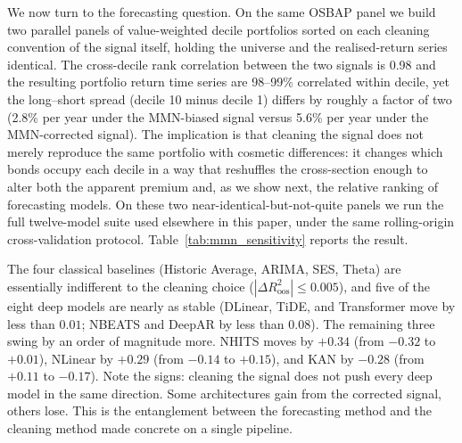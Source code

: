 \documentclass{article}
\newcommand{\floatsource}[1]{\caption*{\footnotesize\emph{#1}}}
\begin{document}
We now turn to the forecasting question. On the same OSBAP panel we build two parallel panels of value-weighted decile portfolios sorted on each cleaning convention of the signal itself, holding the universe and the realised-return series identical. The cross-decile rank correlation between the two signals is 0.98 and the resulting portfolio return time series are 98--99\% correlated within decile, yet the long--short spread (decile 10 minus decile 1) differs by roughly a factor of two (2.8\% per year under the MMN-biased signal versus 5.6\% per year under the MMN-corrected signal). The implication is that cleaning the signal does not merely reproduce the same portfolio with cosmetic differences: it changes which bonds occupy each decile in a way that reshuffles the cross-section enough to alter both the apparent premium and, as we show next, the relative ranking of forecasting models. On these two near-identical-but-not-quite panels we run the full twelve-model suite used elsewhere in this paper, under the same rolling-origin cross-validation protocol. Table~\ref{tab:mmn_sensitivity} reports the result.

\begin{table}[htbp]
\centering
\caption{Forecasting Sensitivity to Signal Cleaning: Credit-Spread Decile Portfolios}
\label{tab:mmn_sensitivity}

\caption*{\footnotesize
\textbf{Note:} Out-of-sample $R^2$ ($R^2_{\text{oos}}$) and Mean Absolute Scaled Error (MASE) for the twelve forecasting models reported elsewhere in the paper, applied to two value-weighted decile-portfolio panels of corporate bonds. The MMN-biased panel sorts bonds by a credit spread constructed from MMN-contaminated TRACE prices. The MMN-corrected panel applies the correction of \citet{Dickerson2024}. The realized return, universe, and cross-validation protocol are held fixed; only the signal used for decile assignment differs. $\Delta$ columns report corrected minus biased. Bold values highlight the best performing model within each level column ($R^2_{\text{oos}}$ higher is better; MASE lower is better).}
\floatsource{Sources: Open Source Bond Asset Pricing, Authors' analysis}
\end{table}

The four classical baselines (Historic Average, ARIMA, SES, Theta) are essentially indifferent to the cleaning choice ($|\Delta R^2_{\text{oos}}| \leq 0.005$), and five of the eight deep models are nearly as stable (DLinear, TiDE, and Transformer move by less than $0.01$; NBEATS and DeepAR by less than $0.08$). The remaining three swing by an order of magnitude more. NHITS moves by $+0.34$ (from $-0.32$ to $+0.01$), NLinear by $+0.29$ (from $-0.14$ to $+0.15$), and KAN by $-0.28$ (from $+0.11$ to $-0.17$). Note the signs: cleaning the signal does not push every deep model in the same direction. Some architectures gain from the corrected signal, others lose. This is the entanglement between the forecasting method and the cleaning method made concrete on a single pipeline.
\end{document}
